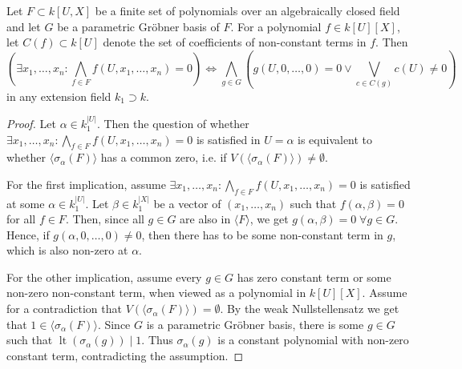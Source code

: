 \documentclass[a4paper, 12pt]{article}
\DeclareMathOperator{\LT}{lt}
\theoremstyle{changedot}
\theoremstyle{changedotbreak}
\theoremstyle{nonumberplain}
\newtheorem{proof}{Proof}
\begin{document}
\begin{theorem}
  Let $F \subset k[U, X]$ be a finite set of polynomials over an algebraically closed field and let $G$ be a parametric Gröbner basis of $F$. For a polynomial $f \in k[U][X]$, let $C(f) \subset k[U]$ denote the set of coefficients of non-constant terms in $f$. Then \[ \left(\exists x_{1}, \dots, x_{n} : \bigwedge_{f \in F} f(U, x_{1}, \dots, x_{n}) = 0 \right) \iff \bigwedge_{g \in G} \left( g(U, 0, \dots, 0) = 0 \lor \bigvee_{c \in C(g)} c(U) \neq 0 \right)\] in any extension field $k_{1} \supset k$.
\end{theorem}
\begin{proof}
  Let $\alpha \in k_{1}^{|U|}$. Then the question of whether $\exists x_{1}, \dots, x_{n} : \bigwedge_{f \in F} f(U, x_{1}, \dots, x_{n}) = 0$ is satisfied in $U = \alpha$ is equivalent to whether $\langle \sigma_{\alpha}(F) \rangle$ has a common zero, i.e. if $V(\langle \sigma_{\alpha}(F) \rangle) \neq \emptyset$.

  For the first implication, assume $\exists x_{1}, \dots, x_{n} : \bigwedge_{f \in F} f(U, x_{1}, \dots, x_{n}) = 0$ is satisfied at some $\alpha \in k_{1}^{|U|}$. Let $\beta \in k_{1}^{|X|}$ be a vector of $(x_{1}, \dots, x_{n})$ such that $f(\alpha, \beta) = 0$ for all $f \in F$. Then, since all $g \in G$ are also in $\langle F \rangle$, we get $g(\alpha, \beta) = 0 \; \forall g \in G$. Hence, if $g(\alpha, 0, \dots, 0) \neq 0$, then there has to be some non-constant term in $g$, which is also non-zero at $\alpha$.

  For the other implication, assume every $g \in G$ has zero constant term or some non-zero non-constant term, when viewed as a polynomial in $k[U][X]$. Assume for a contradiction that $V(\langle \sigma_{\alpha}(F) \rangle) = \emptyset$. By the weak Nullstellensatz we get that $1 \in \langle \sigma_{\alpha}(F) \rangle$. Since $G$ is a parametric Gröbner basis, there is some $g \in G$ such that $\LT(\sigma_{\alpha}(g)) \mid 1$. Thus $\sigma_{\alpha}(g)$ is a constant polynomial with non-zero constant term, contradicting the assumption.
\end{proof}





\printbibliography


\appendix
\end{document}
